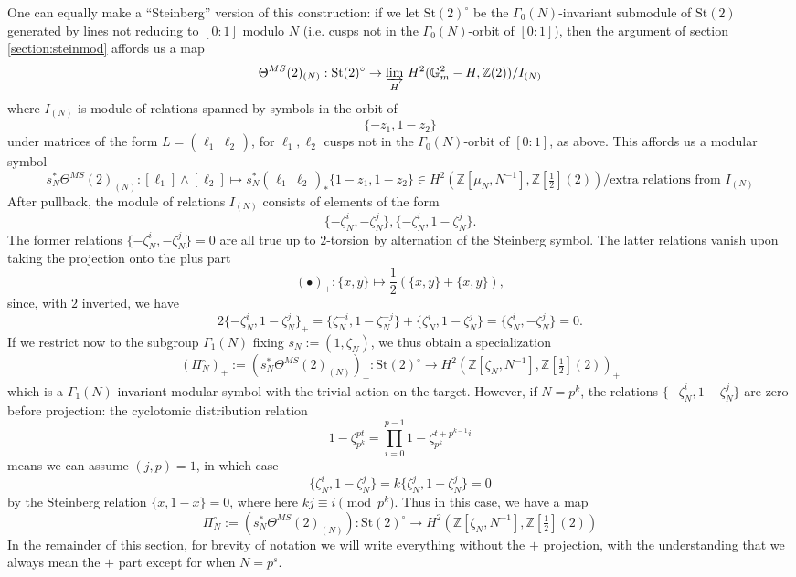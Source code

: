 \documentclass[10pt]{amsart}
\theoremstyle{definition}
\newcommand{\Z}{\mathbb{Z}}
\newcommand{\St}{\mathrm{St}}
\numberwithin{equation}{section}
\begin{document}
    One can equally make a ``Steinberg'' version of this construction: if we let $\St(2)^\circ$ be the $\Gamma_0(N)$-invariant submodule of $\St(2)$ generated by lines not reducing to $[0:1]$ modulo $N$ (i.e. cusps not in the $\Gamma_0(N)$-orbit of $[0:1]$), then the argument of section \ref{section:steinmod} affords us a map
    \[
    \Theta^{MS}(2)_{(N)}: \St(2)^\circ \to \varinjlim_H \,H^2(\mathbb{G}_m^2-H,\mathbb{Z}(2))/I_{(N)}
    \]
    where $I_{(N)}$ is module of relations spanned by symbols in the orbit of 
    \begin{equation} \label{eq:idef}
    \{-z_1,1-z_2\}
    \end{equation}
    under matrices of the form $L=\begin{pmatrix}\ell_1 & \ell_2\end{pmatrix}$, for $\ell_1,\ell_2$ cusps not in the $\Gamma_0(N)$-orbit of $[0:1]$, as above. This affords us a modular symbol
    \[
    s_N^*\Theta^{MS}(2)_{(N)}: [\ell_1]\wedge [\ell_2]\mapsto s_N^* \begin{pmatrix} \ell_1& \ell_2\end{pmatrix}_*\{1-z_1,1-z_2\} \in  H^2(\Z[\mu_N,N^{-1}], \Z[\tfrac{1}{2}](2))/\text{extra relations from }I_{(N)}
    \]
    After pullback, the module of relations $I_{(N)}$ consists of elements of the form 
        \[
        \{-\zeta_{N}^i, -\zeta_{N}^j\}, \{-\zeta_{N}^i, 1-\zeta_{N}^j\}.
        \]
    The former relations $\{-\zeta_{N}^i, -\zeta_{N}^j\}=0$ are all true up to $2$-torsion by alternation of the Steinberg symbol. The latter relations vanish upon taking the projection onto the plus part
    \[
    (\bullet )_+:  \{x,y\} \mapsto\frac{1}{2}(\{x,y\} + \{\overline{x}, \overline{y}\}),
    \]
    since, with $2$ inverted, we have
    \[
    2 \{-\zeta_{N}^i, 1-\zeta_{N}^j\}_+ = \{\zeta_{N}^{-i}, 1-\zeta_{N}^{-j}\} + \{\zeta_{N}^i, 1-\zeta_{N}^j\} = \{\zeta_N^i,- \zeta_N^j\} = 0.
    \]
    If we restrict now to the subgroup $\Gamma_1(N)$ fixing $s_N:=(1,\zeta_N)$, we thus obtain a specialization
    \[
    (\Pi_N^\circ)_+:=(s_N^* \Theta^{MS}(2)_{(N)})_+:\St(2)^\circ \to H^2(\Z[\zeta_N, N^{-1}],\Z[\tfrac{1}{2}](2))_+
    \]
    which is a $\Gamma_1(N)$-invariant modular symbol with the trivial action on the target. However, if $N=p^k$, the relations $\{-\zeta_{N}^i, 1-\zeta_{N}^j\}$ are zero before projection: the cyclotomic distribution relation 
    \[
        1-\zeta_{p^k}^{pt} = \prod_{i=0}^{p-1} 1-\zeta_{p^k}^{t+p^{k-1}i}
    \]
    means we can assume $(j,p)=1$, in which case 
    \[
    \{\zeta_{N}^i, 1-\zeta_{N}^j\}= k\{\zeta_{N}^j, 1-\zeta_{N}^j\}=0
    \]
    by the Steinberg relation $\{x,1-x\}=0$, where here $kj\equiv i \pmod{p^k}$. Thus in this case, we have a map
    \[
        \Pi_N^\circ:=(s_N^* \Theta^{MS}(2)_{(N)}):\St(2)^\circ \to H^2(\Z[\zeta_N, N^{-1}],\Z[\tfrac{1}{2}](2))
    \]
    In the remainder of this section, for brevity of notation we will write everything without the $+$ projection, with the understanding that we always mean the $+$ part except for when $N=p^s$.
\end{document}
